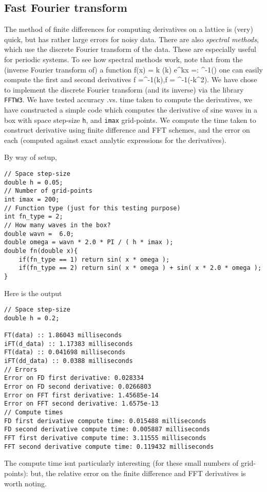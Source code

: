 \documentclass[amsmath,amssymb,12pt, eqsecnum]{revtex4}
\begin{document}
\subsection{Fast Fourier transform}
The method of finite differences for computing derivatives on a lattice is (very) quick, but has rather large errors for noisy data. There are also \textit{spectral methods}, which use  the discrete Fourier transform of the data. These are especially useful for periodic systems. To see how spectral methods work, note that from the (inverse Fourier transform of) a function
\bea
f(x) = \int \dd k (k) e^{\ci kx} =: ^{-1}()
\eea
one can easily compute the first and second derivatives
\bea
{}f =^{-1}(\ci k),\qquad {}f = ^{-1}(-k^2).
\eea
We have chose to implement the discrete    Fourier transform (and its inverse) via the library {\tt FFTW3}. We have tested accuracy .vs. time taken to compute the derivatives, we have constructed a simple code which computes the derivative of   sine waves in a box with space step-size {\tt h}, and {\tt imax} grid-points. We compute the time taken to construct  derivative using   finite difference and FFT schemes, and the error on each (computed against   exact analytic expressions for the derivatives).

By way of setup,
\begin{verbatim}
// Space step-size
double h = 0.05;
// Number of grid-points
int imax = 200;
// Function type (just for this testing purpose)
int fn_type = 2;
// How many waves in the box?
double wavn =  6.0;
double omega = wavn * 2.0 * PI / ( h * imax );
double fn(double x){
    if(fn_type == 1) return sin( x * omega );
    if(fn_type == 2) return sin( x * omega ) + sin( x * 2.0 * omega );
}
\end{verbatim}
Here is the output 
\begin{verbatim}
// Space step-size
double h = 0.2;

FT(data) :: 1.86043 milliseconds
iFT(d_data) :: 1.17383 milliseconds
FT(data) :: 0.041698 milliseconds
iFT(dd_data) :: 0.0388 milliseconds
// Errors
Error on FD first derivative: 0.028334
Error on FD second derivative: 0.0266803
Error on FFT first derivative: 1.45685e-14
Error on FFT second derivative: 1.6575e-13
// Compute times
FD first derivative compute time: 0.015488 milliseconds
FD second derivative compute time: 0.005887 milliseconds
FFT first derivative compute time: 3.11555 milliseconds
FFT second derivative compute time: 0.119432 milliseconds
\end{verbatim}
The compute time  isnt particularly interesting (for these small numbers of grid-points): but, the relative error on the finite difference and FFT derivatives is worth noting.
\end{document}
